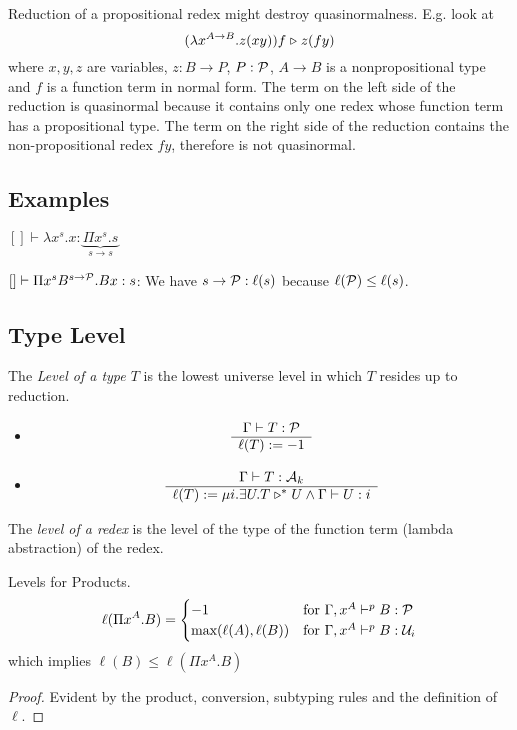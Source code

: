 Reduction of a propositional redex might destroy quasinormalness. E.g. look at
$$
(\lambda x^{A\to B}. z (xy)) f \mathrel{\triangleright} z (f y)
$$
where $x,y,z$ are variables, $z: B \to P$, $P:{\cal P}$, $A\to B$ is a
nonpropositional type and $f$ is a function term in normal form.
%
The term on the left side of the reduction is quasinormal because it contains
only one redex whose function term has a propositional type.
%
The term on the right side of the reduction contains the non-propositional
redex $f y$, therefore is not quasinormal.




\subsection {Examples}

$
[] \vdash \lambda x^s.x : \underbrace{\Pi x^s. s}_{s \to s}
$


$[] \vdash \Pi x^s B^{s \to {\cal P}}. B x : s$: We have $s \to {\cal P}: \ell(s)$
because $\ell({\cal P}) \le \ell(s)$.






\subsection{Type Level}

\begin{definition}
  The \emph{Level of a type $T$} is the lowest universe level in which $T$
  resides up to reduction.
  \begin{itemize}
  \item
    $$
    \begin{array}{c} \Gamma \vdash T : {\cal P} \\ \hline \ell(T) := -1\end{array}
    $$


  \item
    $$
    \begin{array}{c} \Gamma \vdash T: {\cal A}_k \\ \hline \ell(T) := \mu i. \exists U . T \mathrel{\triangleright}^* U \land \Gamma \vdash U : i\end{array}
    $$
  \end{itemize}
\end{definition}


\begin{definition}
  The \emph{level of a redex} is the level of the type of the function term
  (lambda abstraction) of the redex.
\end{definition}


\begin{lemma}
  Levels for Products.
  $$
  \ell(\Pi x^A.B) =
  \begin{cases}
    -1
    & \text{for } \Gamma,x^A \vdash^p B: {\cal P}
    \\
    \text{max}(\ell(A), \ell(B))
    & \text{for } \Gamma,x^A \vdash^p B: {\cal U}_i
  \end{cases}
  $$
  which implies $\ell(B) \le \ell(\Pi x^A.B)$
  \begin{proof} Evident by the product, conversion, subtyping rules and the
    definition of $\ell$.
  \end{proof}
\end{lemma}


